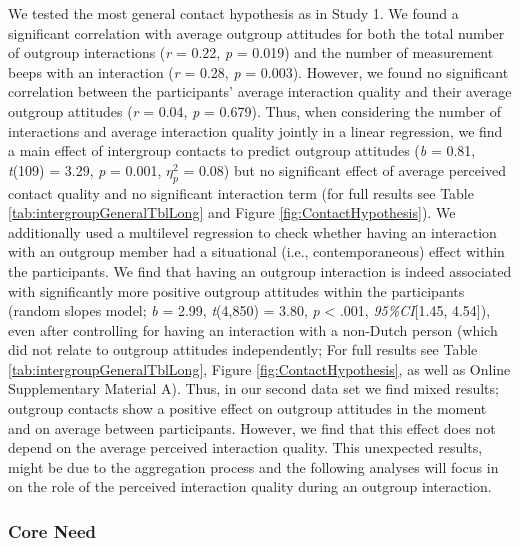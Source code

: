 We tested the most general contact hypothesis as in Study 1. We found a
significant correlation with average outgroup attitudes for both the
total number of outgroup interactions (\textit{r} = 0.22, \textit{p} =
0.019) and the number of measurement beeps with an interaction
(\textit{r} = 0.28, \textit{p} = 0.003). However, we found no
significant correlation between the participants' average interaction
quality and their average outgroup attitudes (\textit{r} = 0.04,
\textit{p} = 0.679). Thus, when considering the number of interactions
and average interaction quality jointly in a linear regression, we find
a main effect of intergroup contacts to predict outgroup attitudes
(\textit{b} = 0.81, \textit{t}(109) = 3.29, \textit{p} = 0.001,
\(\eta_p^2\) = 0.08) but no significant effect of average perceived
contact quality and no significant interaction term (for full results
see Table \ref{tab:intergroupGeneralTblLong} and Figure
\ref{fig:ContactHypothesis}). We additionally used a multilevel
regression to check whether having an interaction with an outgroup
member had a situational (i.e., contemporaneous) effect within the
participants. We find that having an outgroup interaction is indeed
associated with significantly more positive outgroup attitudes within
the participants (random slopes model; \textit{b} = 2.99,
\textit{t}(4,850) = 3.80, \textit{p} \textless{} .001,
\textit{95\%CI}{[}1.45, 4.54{]}), even after controlling for having an
interaction with a non-Dutch person (which did not relate to outgroup
attitudes independently; For full results see Table
\ref{tab:intergroupGeneralTblLong}, Figure \ref{fig:ContactHypothesis},
as well as Online Supplementary Material A). Thus, in our second data
set we find mixed results; outgroup contacts show a positive effect on
outgroup attitudes in the moment and on average between participants.
However, we find that this effect does not depend on the average
perceived interaction quality. This unexpected results, might be due to
the aggregation process and the following analyses will focus in on the
role of the perceived interaction quality during an outgroup
interaction.

\subsubsection{Core Need}

